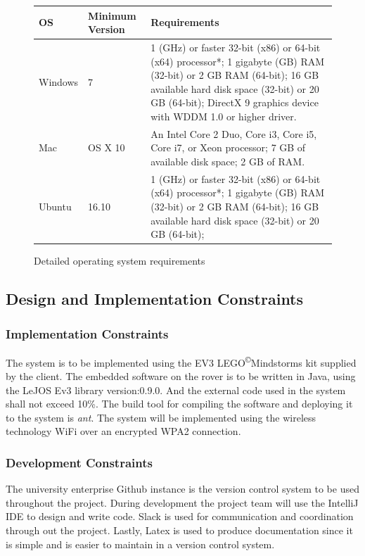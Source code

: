 \documentclass[10pt,a4paper,titlepage]{article}
\newcommand{\cpright}{\textsuperscript{\tiny\copyright}}
\begin{document}
	\begin{figure}
		\centering
		\begin{tabular}{|p{2cm}|p{2cm}|p{7cm}|}
			\hline 
			\textbf{OS} &\textbf{Minimum Version} & \textbf{Requirements} \\ 
			\hline 
			Windows & 7 & 1 (GHz) or faster 32-bit (x86) or 64-bit (x64) processor*;
			1 gigabyte (GB) RAM (32-bit) or 2 GB RAM (64-bit);
			16 GB available hard disk space (32-bit) or 20 GB (64-bit);
			DirectX 9 graphics device with WDDM 1.0 or higher driver. \\ 
			\hline 
			Mac & OS X 10 & An Intel Core 2 Duo, Core i3, Core i5, Core i7, or Xeon processor;
			7 GB of available disk space;
			2 GB of RAM. \\ 
			\hline 
			Ubuntu & 16.10 & 1 (GHz) or faster 32-bit (x86) or 64-bit (x64) processor*;
			1 gigabyte (GB) RAM (32-bit) or 2 GB RAM (64-bit);
			16 GB available hard disk space (32-bit) or 20 GB (64-bit); \\
			\hline 
		\end{tabular} 
		\caption{Detailed operating system requirements}
		\label{fig:tab Os Requirements}
	\end{figure}
	
	\subsection{Design and Implementation Constraints}
	\subsubsection*{Implementation Constraints}
	The system is to be implemented using the EV3 LEGO\cpright Mindstorms kit supplied by the client. The embedded software on the rover is to be written in Java, using the LeJOS Ev3 library version:0.9.0. And the external code used in the system shall not exceed 10\%. The build tool for compiling the software and deploying it to the system is \textit{ant}. The system will be implemented using the wireless technology WiFi over an encrypted WPA2 connection.
	
	\subsubsection*{Development Constraints}
	The university enterprise Github instance is the version control system to be used throughout the project. During development the project team will use the IntelliJ IDE to design and write code. Slack is used for communication and coordination through out the project. Lastly, Latex is used to produce documentation since it is simple and is easier to maintain in a version control system.
	
\end{document}
